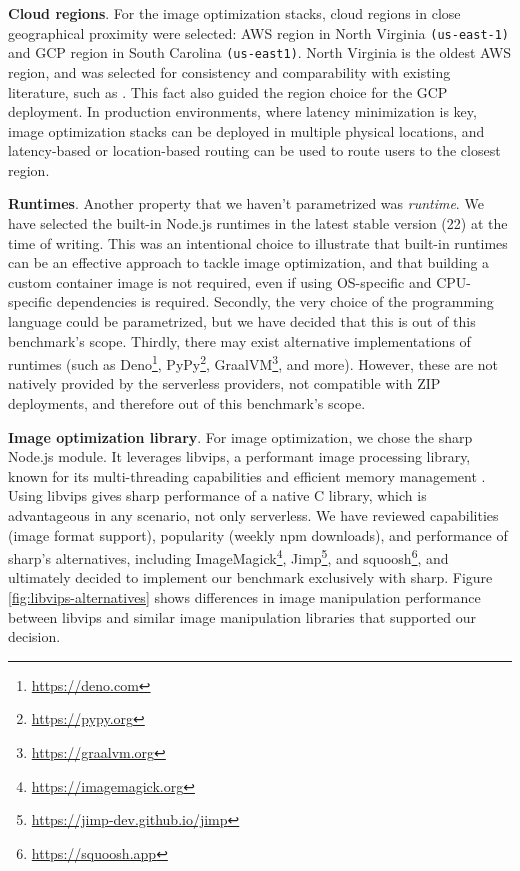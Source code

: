 \textbf{Cloud regions}. For the image optimization stacks, cloud regions in close geographical proximity were selected: AWS region in North Virginia \texttt{(us-east-1)} and GCP region in South Carolina \texttt{(us-east1)}. North Virginia is the oldest AWS region, and was selected for consistency and comparability with existing literature, such as \cite{ginzburg2020serverless}. This fact also guided the region choice for the GCP deployment. In production environments, where latency minimization is key, image optimization stacks can be deployed in multiple physical locations, and latency-based or location-based routing can be used to route users to the closest region.

\textbf{Runtimes}. Another property that we haven't parametrized was \emph{runtime}. We have selected the built-in Node.js runtimes in the latest stable version (22) at the time of writing. This was an intentional choice to illustrate that built-in runtimes can be an effective approach to tackle image optimization, and that building a custom container image is not required, even if using OS-specific and CPU-specific dependencies is required. Secondly, the very choice of the programming language could be parametrized, but we have decided that this is out of this benchmark's scope. Thirdly, there may exist alternative implementations of runtimes (such as Deno\footnote{\url{https://deno.com}}, PyPy\footnote{{\url{https://pypy.org}}}, GraalVM\footnote{\url{https://graalvm.org}}, and more). However, these are not natively provided by the serverless providers, not compatible with ZIP deployments, and therefore out of this benchmark's scope.

\textbf{Image optimization library}. For image optimization, we chose the sharp Node.js module. It leverages libvips, a performant image processing library, known for its multi-threading capabilities and efficient memory management \cite{cupitt2024libvips-speed}. Using libvips gives sharp performance of a native C library, which is advantageous in any scenario, not only serverless. We have reviewed capabilities (image format support), popularity (weekly npm downloads), and performance \cite{fuller2024sharp} of sharp's alternatives, including ImageMagick\footnote{\url{https://imagemagick.org}}, Jimp\footnote{\url{https://jimp-dev.github.io/jimp}}, and squoosh\footnote{\url{https://squoosh.app}}, and ultimately decided to implement our benchmark exclusively with sharp. Figure \ref{fig:libvips-alternatives} shows differences in image manipulation performance between libvips and similar image manipulation libraries that supported our decision.

